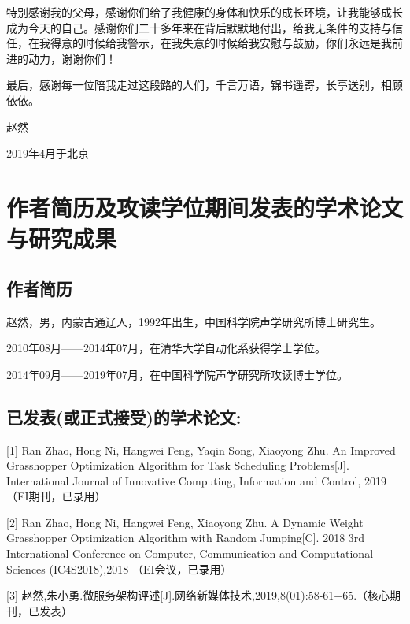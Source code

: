特别感谢我的父母，感谢你们给了我健康的身体和快乐的成长环境，让我能够成长成为今天的自己。感谢你们二十多年来在背后默默地付出，给我无条件的支持与信任，在我得意的时候给我警示，在我失意的时候给我安慰与鼓励，你们永远是我前进的动力，谢谢你们！

最后，感谢每一位陪我走过这段路的人们，千言万语，锦书遥寄，长亭送别，相顾依依。

\begin{flushright}

    赵然

    2019年4月于北京


\end{flushright}


\chapter{作者简历及攻读学位期间发表的学术论文与研究成果}


\section*{作者简历}

赵然，男，内蒙古通辽人，1992年出生，中国科学院声学研究所博士研究生。

2010年08月——2014年07月，在清华大学自动化系获得学士学位。

2014年09月——2019年07月，在中国科学院声学研究所攻读博士学位。


\section*{已发表(或正式接受)的学术论文:}

[1] Ran Zhao, Hong Ni, Hangwei Feng, Yaqin Song, Xiaoyong Zhu. An Improved Grasshopper Optimization Algorithm for Task Scheduling Problems[J]. International Journal of Innovative Computing, Information and Control, 2019（EI期刊，已录用）

[2] Ran Zhao, Hong Ni, Hangwei Feng, Xiaoyong Zhu. A Dynamic Weight Grasshopper Optimization Algorithm with Random Jumping[C]. 2018 3rd International Conference on Computer, Communication and Computational Sciences (IC4S2018),2018 （EI会议，已录用）

[3] 赵然,朱小勇.微服务架构评述[J].网络新媒体技术,2019,8(01):58-61+65.（核心期刊，已发表）


